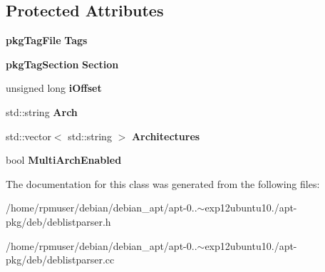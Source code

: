 \subsection*{\-Protected \-Attributes}
\begin{DoxyCompactItemize}
\item 
{\bf pkg\-Tag\-File} {\bfseries \-Tags}\label{classdebListParser_a56fb4a3ec342b9f491120135aa74923d}

\item 
{\bf pkg\-Tag\-Section} {\bfseries \-Section}\label{classdebListParser_a1826b1e33f5fa7e90d6ff86fea78e88b}

\item 
unsigned long {\bfseries i\-Offset}\label{classdebListParser_abfc00c1dd769d9b55665cbea01ed6cf3}

\item 
std\-::string {\bfseries \-Arch}\label{classdebListParser_ad2f7761f18ebac2e10b9aafca47806c0}

\item 
std\-::vector$<$ std\-::string $>$ {\bfseries \-Architectures}\label{classdebListParser_afd0b978645ca79fcb0653a0d3ecda7de}

\item 
bool {\bfseries \-Multi\-Arch\-Enabled}\label{classdebListParser_aad93bdcb19eb95fd0aaadadae2a67485}

\end{DoxyCompactItemize}


\-The documentation for this class was generated from the following files\-:\begin{DoxyCompactItemize}
\item 
/home/rpmuser/debian/debian\-\_\-apt/apt-\/0..$\sim$exp12ubuntu10./apt-\/pkg/deb/deblistparser.\-h\item 
/home/rpmuser/debian/debian\-\_\-apt/apt-\/0..$\sim$exp12ubuntu10./apt-\/pkg/deb/deblistparser.\-cc\end{DoxyCompactItemize}
